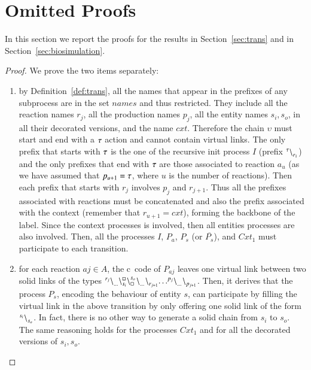 \newpage

\section{Omitted Proofs}
In this section we report the proofs for the results in Section~\ref{sec:trans} and in Section~\ref{sec:biosimulation}.

\lemmastruct*
\begin{proof}
  We prove the two items separately:
  \begin{enumerate}
\item by Definition~\ref{def:trans}, all the names that appear in the prefixes of any subprocess are in the set $\mathit{names}$ and thus restricted. 
They include all the reaction names $r_j$, all the production names $p_j$, all the entity names $s_i,s_o$, in all their decorated versions, and the name $\mathit{cxt}$. 
Therefore the chain $\upsilon$ must start and end with a $\tau$ action and cannot contain virtual links.
The only prefix that starts with $\tau$ is the one of the recursive init process $I$ (prefix ${}^{\tau} \backslash_{r_1}^{}$) and the only prefixes that end with $\tau$ are those associated to reaction $a_u$ (as we have assumed that $p_{u+1} = \tau$, where $u$ is the number of reactions).
Then each prefix that starts with $r_j$ involves $p_j$ and $r_{j+1}$.
Thus all the prefixes associated with reactions must be concatenated and also the prefix associated with the context (remember that $r_{u+1} = \mathit{cxt}$), forming the backbone of the label.
Since the context processes is involved, then all entities processes are also involved.
Then, all the processes $I$, $P_a$, $P_s$ (or $\overline{P_s}$), and $\mathit{Cxt}_1$  must participate to each transition.
 \item for each reaction $aj \in A$, the c\CNA \ code of  $P_{aj}$ leaves one virtual link between two solid links of the types ${}^{r_j} \backslash_{\dots}^{} \backslash_{s_{i}}^{\scriptstyle {\square}}\backslash_{\scriptstyle {\square}}^{s_{o}}{}^{} \backslash_{\dots}^{}{}^{} \backslash_{r_{j+1}}^{} {\dots}{}^{p_j} \backslash_{\dots}^{}{}^{} \backslash_{p_{j+1}}^{}$. Then, it derives that the process $P_{s}$, encoding the behaviour of entity $s$, can participate by filling the virtual link in the above transition by only offering one solid link of the form ${}^{s_{i}} \backslash_{s_{o}}^{}$. In fact, there is no other way to generate a solid chain from $s_{i}$ to $s_{o}$.
 The same reasoning holds for the processes $\mathit{Cxt}_1$ and for all the decorated versions of $s_i,s_o$.
   \end{enumerate}
  \end{proof}
  
